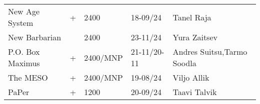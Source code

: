 \begin{table}[ht]
\begin{tabular}{llp{2cm}p{3cm}p{4cm}}
New Age System                 & +    & 2400               & 18-09/24                                      & Tanel Raja\index[ppl]{Raja, Tanel}                  \\
New Barbarian                  &      & 2400               & 23-11/24                                      & Yura Zaitsev\index[ppl]{Zaitsev, Yura}                \\
P.O. Box Maximus               & +    & 2400/MNP           & 21-11/20-11                                   & Andres Suitsu\index[ppl]{Suitsu, Andres},Tarmo Soodla\index[ppl]{Soodla, Tarmo}  \\
The MESO                       & +    & 2400/MNP           & 19-08/24                                      & Viljo Allik\index[ppl]{Allik, Viljo}                 \\
PaPer                          & +    & 1200               & 20-09/24                                      & Taavi Talvik\index[ppl]{Talvik, Taavi}               \\
\bottomrule
\end{tabular}
\end{table}